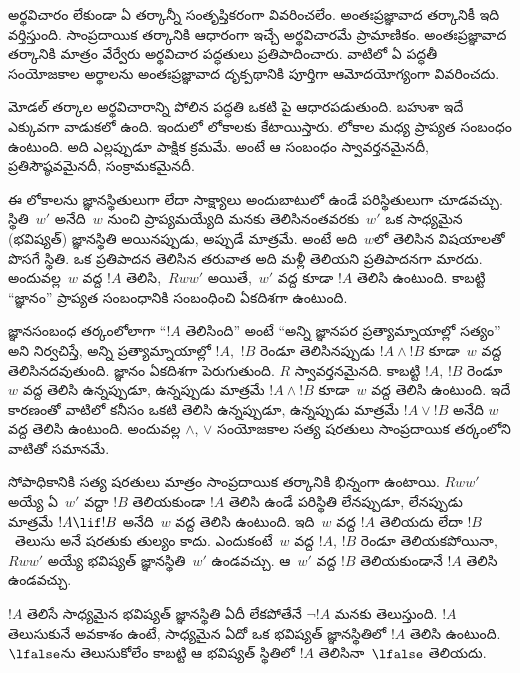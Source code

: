 \documentclass[../../../include/open-logic-section]{subfiles}
\begin{document}


అర్థవిచారం లేకుండా ఏ తర్కాన్నీ సంతృప్తికరంగా
వివరించలేం. అంతఃప్రజ్ఞావాద తర్కానికీ ఇది వర్తిస్తుంది.
సాంప్రదాయిక తర్కానికి 
ఆధారంగా ఇచ్చే అర్థవిచారమే ప్రామాణికం. అంతఃప్రజ్ఞావాద
తర్కానికి మాత్రం వేర్వేరు అర్థవిచార పద్ధతులు ప్రతిపాదించారు.
వాటిలో ఏ పద్ధతీ సంయోజకాల అర్థాలను అంతఃప్రజ్ఞావాద
దృక్పథానికి పూర్తిగా ఆమోదయోగ్యంగా వివరించదు.

మోడల్ తర్కాల అర్థవిచారాన్ని పోలిన పద్ధతి ఒకటి
పై ఆధారపడుతుంది.
బహుశా ఇదే ఎక్కువగా వాడుకలో ఉంది. ఇందులో
లోకాలకు కేటాయిస్తారు. లోకాల మధ్య ప్రాప్యత సంబంధం
ఉంటుంది. అది ఎల్లప్పుడూ పాక్షిక క్రమమే. అంటే ఆ సంబంధం
స్వావర్తనమైనదీ, ప్రతిసౌష్ఠవమైనదీ, సంక్రామకమైనదీ.

ఈ లోకాలను జ్ఞానస్థితులుగా లేదా సాక్ష్యాలు అందుబాటులో ఉండే పరిస్థితులుగా
చూడవచ్చు. స్థితి~$w'$ అనేది~$w$ నుంచి ప్రాప్యమయ్యేది
మనకు తెలిసినంతవరకు~$w'$ ఒక సాధ్యమైన (భవిష్యత్) జ్ఞానస్థితి
అయినప్పుడు, అప్పుడే మాత్రమే. అంటే అది~$w$లో తెలిసిన విషయాలతో పొసగే స్థితి. ఒక ప్రతిపాదన తెలిసిన తరువాత
అది మళ్లీ తెలియని ప్రతిపాదనగా మారదు. అందువల్ల~$w$ వద్ద $!A$
తెలిసి,~$Rww'$ అయితే,~$w'$ వద్ద కూడా $!A$
తెలిసి ఉంటుంది. కాబట్టి ``జ్ఞానం'' ప్రాప్యత సంబంధానికి
సంబంధించి ఏకదిశగా ఉంటుంది.

జ్ఞానసంబంధ తర్కంలోలాగా ``$!A$ తెలిసింది'' అంటే
``అన్ని జ్ఞానపర ప్రత్యామ్నాయాల్లో సత్యం'' అని
నిర్వచిస్తే, అన్ని ప్రత్యామ్నాయాల్లో $!A$,~$!B$
రెండూ తెలిసినప్పుడు $!A \land !B$ కూడా~$w$
వద్ద తెలిసినదవుతుంది. జ్ఞానం ఏకదిశగా పెరుగుతుంది.
$R$ స్వావర్తనమైనది. కాబట్టి $!A$, $!B$ రెండూ~$w$ వద్ద
తెలిసి ఉన్నప్పుడూ, ఉన్నప్పుడు మాత్రమే $!A \land !B$ కూడా~$w$ వద్ద తెలిసి ఉంటుంది. ఇదే కారణంతో
వాటిలో కనీసం ఒకటి తెలిసి ఉన్నప్పుడూ, ఉన్నప్పుడు మాత్రమే
$!A \lor !B$ అనేది $w$ వద్ద తెలిసి ఉంటుంది. అందువల్ల
$\land$, $\lor$ సంయోజకాల సత్య షరతులు సాంప్రదాయిక
తర్కంలోని వాటితో సమానమే.

సోపాధికానికి సత్య షరతులు మాత్రం సాంప్రదాయిక
తర్కానికి భిన్నంగా ఉంటాయి. $Rww'$ అయ్యే ఏ~$w'$
వద్దా $!B$ తెలియకుండా $!A$ తెలిసి ఉండే పరిస్థితి లేనప్పుడూ,
లేనప్పుడు మాత్రమే $!A \lif !B$ అనేది~$w$ వద్ద
తెలిసి ఉంటుంది. ఇది~$w$ వద్ద $!A$ తెలియదు
లేదా $!B$~తెలుసు అనే షరతుకు తుల్యం కాదు.
ఎందుకంటే~$w$ వద్ద $!A$, $!B$ రెండూ తెలియకపోయినా,
$Rww'$ అయ్యే భవిష్యత్ జ్ఞానస్థితి~$w'$ ఉండవచ్చు.
ఆ~$w'$ వద్ద $!B$ తెలియకుండానే $!A$ తెలిసి ఉండవచ్చు.

$!A$ తెలిసే సాధ్యమైన భవిష్యత్ జ్ఞానస్థితి
ఏదీ లేకపోతేనే $\lnot !A$ మనకు తెలుస్తుంది.
$!A$ తెలుసుకునే అవకాశం ఉంటే, సాధ్యమైన ఏదో ఒక భవిష్యత్
జ్ఞానస్థితిలో $!A$ తెలిసి ఉంటుంది.
$\lfalse$ను తెలుసుకోలేం కాబట్టి ఆ భవిష్యత్ స్థితిలో
$!A$ తెలిసినా~$\lfalse$ తెలియదు.
\end{document}
